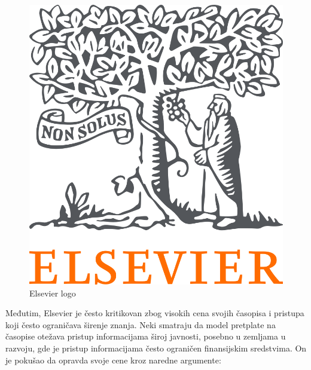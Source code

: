 \documentclass{article}
\begin{document}
\begin{figure}[htbp]
    \center
    \includegraphics[scale=0.15]{img/elsevier-logo.png}
    \caption{Elsevier logo}
\end{figure}

Međutim, Elsevier je često kritikovan zbog visokih cena svojih časopisa i pristupa koji često ograničava širenje znanja. Neki smatraju da model pretplate na časopise otežava pristup informacijama široj javnosti, posebno u zemljama u razvoju, gde je pristup informacijama često ograničen finansijskim sredstvima. On je pokušao da opravda svoje cene kroz naredne argumente:
\end{document}
